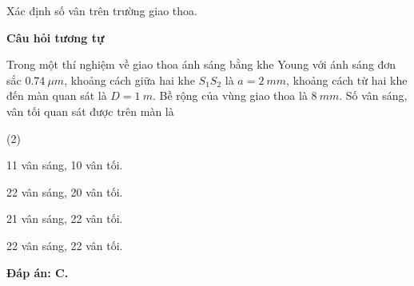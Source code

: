 \begin{dang}{Xác định số vân trên trường giao thoa.}
{\begin{itemize}
		\end{itemize}
		
		\begin{center}
			\textbf{Câu hỏi tương tự}
		\end{center}
		
		Trong một thí nghiệm về giao thoa ánh sáng bằng khe Young với ánh sáng đơn sắc $ \SI{0,74}{\mu m} $, khoảng cách giữa hai khe $ S_{1} S_{2} $ là $ a = \SI{2}{mm} $, khoảng cách từ hai khe đến màn quan sát là $ D = \SI{1}{m} $. Bề rộng của vùng giao thoa là $ \SI{8}{mm} $. Số vân sáng, vân tối quan sát được trên màn là
		\begin{mcq}(2)
			\item 11 vân sáng, 10 vân tối.        
			\item 22 vân sáng, 20 vân tối.
			\item 21 vân sáng, 22 vân tối.          
			\item 22 vân sáng, 22 vân tối.
		\end{mcq}
		\textbf{Đáp án: C.}
	}
\end{dang}

